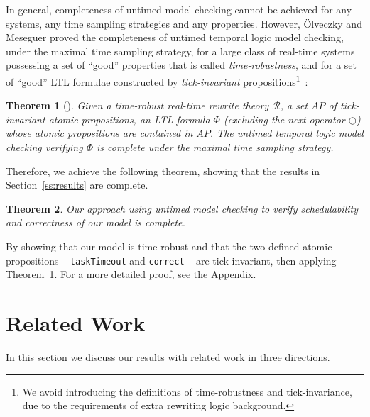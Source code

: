 \documentclass[12pt,onecolumn]{IEEEtranTIE}
\newtheorem{theorem}{Theorem}
\begin{document}
In general, completeness of untimed model checking cannot be achieved
for any systems, any time sampling strategies and any
properties. However, \"Olveczky and Meseguer proved the completeness
of untimed temporal logic model checking, under the maximal time
sampling strategy, for a large class of real-time systems possessing a
set of ``good'' properties that is called \emph{time-robustness}, and
for a set of ``good'' LTL formulae constructed by
\emph{tick-invariant} propositions\footnote{We avoid introducing the
  definitions of time-robustness and tick-invariance, due to the
  requirements of extra rewriting logic
  background.}~\cite{DBLP:journals/entcs/OlveczkyM07a}:
\begin{theorem}[\cite{DBLP:journals/entcs/OlveczkyM07a}]
\label{t:completeness}
Given a time-robust real-time rewrite theory $\mathcal{R}$, a set $AP$
of tick-invariant atomic propositions, an LTL formula $\Phi$
(excluding the \emph{next} operator $\bigcirc$) whose atomic
propositions are contained in $AP$. The untimed temporal logic model
checking verifying $\Phi$ is \emph{complete} under the maximal time
sampling strategy.
\end{theorem}

Therefore, we achieve the following theorem, showing that the results
in Section~\ref{ss:results} are complete.
\begin{theorem}
\label{t:main}
Our approach using untimed model checking to verify schedulability
and correctness of our model is complete.
\end{theorem}
\begin{IEEEproof}
By showing that our model is time-robust and that the two defined
atomic propositions -- \verb|taskTimeout| and \verb|correct| -- are
tick-invariant, then applying Theorem~\ref{t:completeness}. For a more
detailed proof, see the Appendix.
\end{IEEEproof}


\section{Related Work}
\label{s:relate}
In this section we discuss our results with related
work in three directions.
\end{document}
